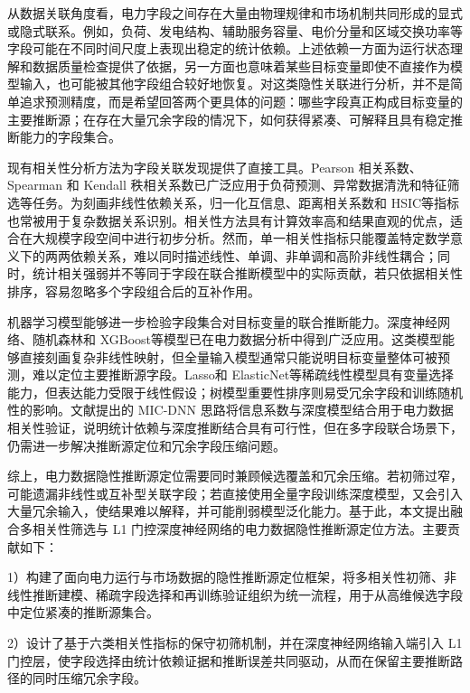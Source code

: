 \documentclass[UTF8,zihao=5,twoside]{ctexart}
\numberwithin{equation}{section}
\begin{document}
从数据关联角度看，电力字段之间存在大量由物理规律和市场机制共同形成的显式或隐式联系。例如，负荷、发电结构、辅助服务容量、电价分量和区域交换功率等字段可能在不同时间尺度上表现出稳定的统计依赖。上述依赖一方面为运行状态理解和数据质量检查提供了依据，另一方面也意味着某些目标变量即使不直接作为模型输入，也可能被其他字段组合较好地恢复。对这类隐性关联进行分析，并不是简单追求预测精度，而是希望回答两个更具体的问题：哪些字段真正构成目标变量的主要推断源；在存在大量冗余字段的情况下，如何获得紧凑、可解释且具有稳定推断能力的字段集合。

现有相关性分析方法为字段关联发现提供了直接工具。Pearson 相关系数、Spearman 和 Kendall 秩相关系数已广泛应用于负荷预测、异常数据清洗和特征筛选等任务\cite{ref-lan-load,ref-jiao-pv,ref-deng-load}。为刻画非线性依赖关系，归一化互信息、距离相关系数\cite{ref-szekely-dcorr}和 HSIC\cite{ref-gretton-hsic}等指标也常被用于复杂数据关系识别。相关性方法具有计算效率高和结果直观的优点，适合在大规模字段空间中进行初步分析。然而，单一相关性指标只能覆盖特定数学意义下的两两依赖关系，难以同时描述线性、单调、非单调和高阶非线性耦合；同时，统计相关强弱并不等同于字段在联合推断模型中的实际贡献，若只依据相关性排序，容易忽略多个字段组合后的互补作用。

机器学习模型能够进一步检验字段集合对目标变量的联合推断能力。深度神经网络、随机森林\cite{ref-breiman-rf}和 XGBoost\cite{ref-chen-xgboost}等模型已在电力数据分析中得到广泛应用\cite{ref-wang-meter}。这类模型能够直接刻画复杂非线性映射，但全量输入模型通常只能说明目标变量整体可被预测，难以定位主要推断源字段。Lasso\cite{ref-tibshirani-lasso}和 ElasticNet\cite{ref-zou-enet}等稀疏线性模型具有变量选择能力，但表达能力受限于线性假设；树模型重要性排序则易受冗余字段和训练随机性的影响。文献\cite{ref-xing-micdnn}提出的 MIC-DNN 思路将信息系数与深度模型结合用于电力数据相关性验证，说明统计依赖与深度推断结合具有可行性，但在多字段联合场景下，仍需进一步解决推断源定位和冗余字段压缩问题。

综上，电力数据隐性推断源定位需要同时兼顾候选覆盖和冗余压缩。若初筛过窄，可能遗漏非线性或互补型关联字段；若直接使用全量字段训练深度模型，又会引入大量冗余输入，使结果难以解释，并可能削弱模型泛化能力。基于此，本文提出融合多相关性筛选与 L1 门控深度神经网络的电力数据隐性推断源定位方法。主要贡献如下：

1）构建了面向电力运行与市场数据的隐性推断源定位框架，将多相关性初筛、非线性推断建模、稀疏字段选择和再训练验证组织为统一流程，用于从高维候选字段中定位紧凑的推断源集合。

2）设计了基于六类相关性指标的保守初筛机制，并在深度神经网络输入端引入 L1 门控层，使字段选择由统计依赖证据和推断误差共同驱动，从而在保留主要推断路径的同时压缩冗余字段。
\end{document}
